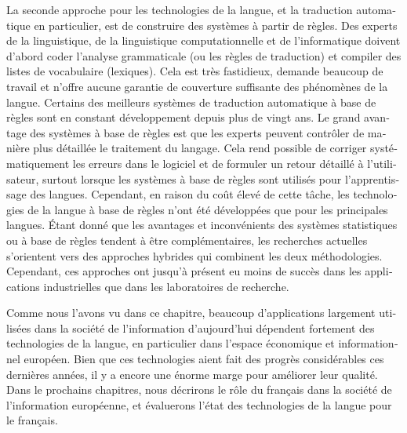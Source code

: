 \begin{french}
\begin{multicols}{2}
La seconde approche pour les technologies de la langue, et la
traduction automatique en particulier, est de construire des systèmes
à partir de règles. Des experts de la linguistique, de la linguistique
computationnelle et de l'informatique doivent d'abord
coder l'analyse grammaticale (ou les règles de traduction) et
compiler des listes de vocabulaire (lexiques). Cela est très
fastidieux, demande beaucoup de travail et n'offre aucune garantie de
couverture suffisante des phénomènes de la langue. Certains des
meilleurs systèmes de traduction automatique à base de règles sont en
constant développement depuis plus de vingt ans. Le grand avantage des
systèmes à base de règles est que les experts peuvent contrôler de
manière plus détaillée le traitement du langage. Cela rend possible de
corriger systématiquement les erreurs dans le logiciel et de formuler
un retour détaillé à l'utilisateur, surtout lorsque les
systèmes à base de règles sont utilisés pour l'apprentissage
des langues. Cependant, en raison du coût élevé de cette tâche, les
technologies de la langue à base de règles n'ont été
développées que pour les principales langues.
Étant donné que les avantages et inconvénients des systèmes
statistiques ou à base de règles tendent à être complémentaires, les
recherches actuelles s'orientent vers des approches hybrides qui
combinent les deux méthodologies. Cependant, ces approches ont jusqu'à
présent eu moins de succès dans les applications industrielles que
dans les laboratoires de recherche.

Comme nous l'avons vu dans ce chapitre, beaucoup d'applications
largement utilisées dans la société de l'information d'aujourd'hui
dépendent fortement des technologies de la langue, en particulier dans
l'espace économique et informationnel européen. Bien que ces
technologies aient fait des progrès considérables ces dernières
années, il y a encore une énorme marge pour améliorer leur
qualité. Dans le prochains chapitres, nous décrirons le rôle du
français dans la société de l'information européenne, et évaluerons
l'état des technologies de la langue pour le français.
\end{multicols}

\clearpage



\end{french}

